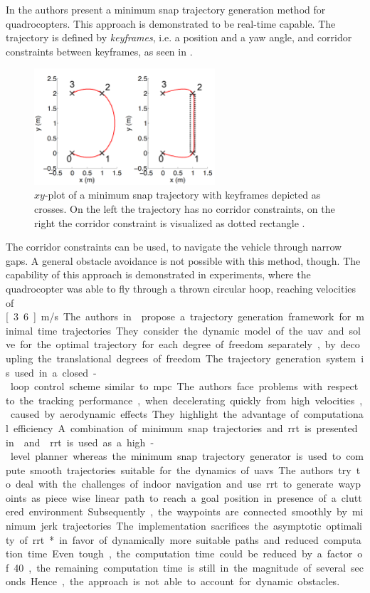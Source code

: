 In \cite{MellingerKumar11} the authors present a minimum snap trajectory generation method for quadrocopters. This approach is demonstrated to be real-time capable. The trajectory is defined by \emph{keyframes}, i.e. a position and a yaw angle, and corridor constraints between keyframes, as seen in .
\begin{figure}
    \centering
    \includegraphics[width=0.6\textwidth]{images/02/mellinger.png}
    \caption{$xy$-plot of a minimum snap trajectory with keyframes depicted as crosses. On the left the trajectory has no corridor constraints, on the right the corridor constraint is visualized as dotted rectangle \cite{MellingerKumar11}.}
    \label{fig:mellinger}
\end{figure}
The corridor constraints can be used, to navigate the vehicle through narrow gaps. A general obstacle avoidance is not possible with this method, though.
The capability of this approach is demonstrated in experiments, where the quadrocopter was able to fly through a thrown circular hoop, reaching velocities of \unit[3.6]{m/s}.

The authors in \cite{Hehn11} propose a trajectory generation framework for minimal time trajectories. They consider the dynamic model of the \ac{uav} and solve for the optimal trajectory for each degree of freedom separately, by decoupling the translational degrees of freedom. The trajectory generation system is used in a closed-loop control scheme similar to \ac{mpc}. The authors face problems with respect to the tracking performance, when decelerating quickly from high velocities, caused by aerodynamic effects. They highlight the advantage of computational efficiency.

A combination of minimum snap trajectories and \ac{rrt} is presented in \cite{Richter16} and \cite{Shi20}.
\ac{rrt} is used as a high-level planner whereas the minimum snap trajectory generator is used to compute smooth trajectories suitable for the dynamics of \acp{uav}. 
The authors try to deal with the challenges of indoor navigation and use \ac{rrt} to generate waypoints as piece wise linear path to reach a goal position in presence of a cluttered environment. Subsequently, the waypoints are connected smoothly by minimum jerk trajectories.
The implementation sacrifices the asymptotic optimality of \ac{rrt}* in favor of dynamically more suitable paths and reduced computation time. Even tough, the computation time could be reduced by a factor of 40, the remaining computation time is still in the magnitude of several seconds. Hence, the approach is not able to account for dynamic obstacles.

